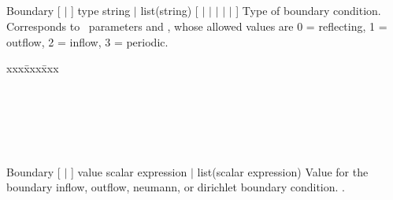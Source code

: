 \documentclass{book}
\begin{document}



\subsection{}

\Parameter
{Boundary}
{[  $|$  ]}
{type}
{string $|$ list(string)}
{ [  $|$ $|$ $|$
  $|$ $|$  ] }
{ Type of boundary condition.  Corresponds to \enzo\ parameters
   and
  , whose allowed values are 0 = reflecting, 1 = outflow, 2 = inflow, 3 = periodic.}
{
\begin{tabbing}
xxx\=xxx\=xxx\kill
  \\
\> \\
\>    \\
\>    \\
\>\>       \\
\>   \code{\}} \\
\code{\}}
\end{tabbing}
}
{}

\Parameter
{Boundary}
{[  $|$  ]}
{value}
{scalar expression $|$ list(scalar expression) }
{}
{ Value for the boundary inflow, outflow, neumann, or dirichlet
  boundary condition.   .}
{}
\end{document}
